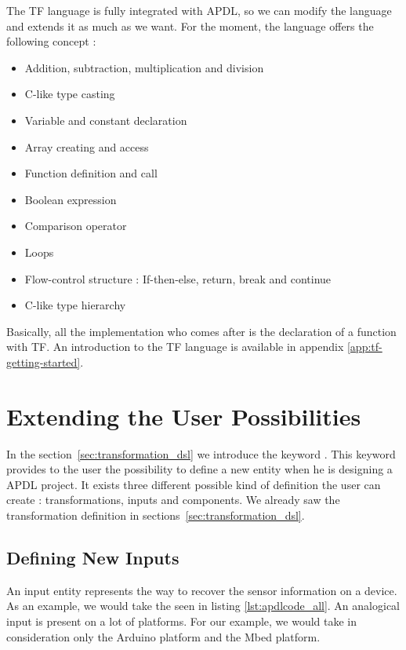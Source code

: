 The \gls{TF} language is fully integrated with \gls{APDL}, so we can modify the
language and extends it as much as we want. For the moment, the language offers
the following concept :

\begin{itemize}
\item Addition, subtraction, multiplication and division
\item C-like type casting
\item Variable and constant declaration
\item Array creating and access
\item Function definition and call
\item Boolean expression
\item Comparison operator
\item Loops
\item Flow-control structure : If-then-else, return, break and continue
\item C-like type hierarchy
\end{itemize}

Basically, all the implementation who comes after 
is the declaration of a function with \gls{TF}. An introduction to the \gls{TF}
language is available in appendix \ref{app:tf-getting-started}.

\section{Extending the User Possibilities}
\label{sec:extending_user_possibilities}

In the section~\ref{sec:transformation_dsl} we introduce the keyword
. This keyword provides to the user the possibility to define
a new entity when he is designing a \gls{APDL} project. It exists three different
possible kind of definition the user can create : transformations, inputs and
components. We already saw the transformation definition in
sections~\ref{sec:transformation_dsl}.

\subsection{Defining New Inputs}
\label{sec:defining_new_input}

An input entity represents the way to recover the sensor information on a
device. As an example, we would take the  seen in
listing \ref{lst:apdlcode_all}. An analogical input is present on a lot of
platforms. For our example, we would take in consideration only the Arduino
platform\cite{ArduinoSoftware2017} and the Mbed platform\cite{ARMmbed}.

